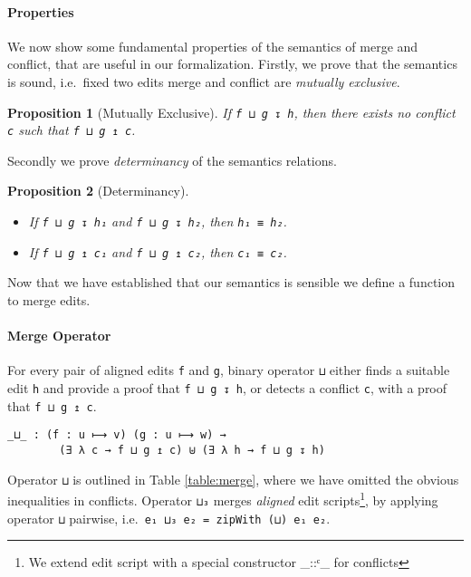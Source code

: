 \documentclass{sigplanconf}
\theoremstyle{plain}
\newtheorem{prop}{Proposition}
\begin{document}
\paragraph{Properties}
We now show some fundamental properties of the semantics of merge and
conflict, that are useful in our formalization.
Firstly, we prove that the semantics is sound, i.e.\ fixed two edits
merge and conflict are \emph{mutually exclusive}.
\begin{prop}[Mutually Exclusive]
  \label{prop:mutually-exclusive}
  If \texttt{f ⊔ g ↧ h}, then there exists no conflict \texttt{c} such
  that \texttt{f ⊔ g ↥ c}.
\end{prop}
Secondly we prove \emph{determinancy} of the semantics relations.
\begin{prop}[Determinancy]
\mbox{}
\label{prop:determinancy}
\begin{itemize}
\item If \texttt{f ⊔ g ↧ h₁} and \texttt{f ⊔ g ↧ h₂}, then \texttt{h₁
    ≡ h₂}.
%
\item  If \texttt{f ⊔ g ↥ c₁} and \texttt{f ⊔ g ↥ c₂}, then \texttt{c₁ ≡ c₂}.
\end{itemize}
\end{prop}
Now that we have established that our semantics is sensible we define
a function to merge edits.

\paragraph{Merge Operator}
For every pair of aligned edits \texttt{f} and \texttt{g}, binary
operator \texttt{⊔} either finds a suitable edit \texttt{h} and
provide a proof that \texttt{f ⊔ g ↧ h}, or detects a conflict
\texttt{c}, with a proof that \texttt{f ⊔ g ↥ c}.
        
\begin{verbatim}
_⊔_ : (f : u ⟼ v) (g : u ⟼ w) →
        (∃ λ c → f ⊔ g ↥ c) ⊎ (∃ λ h → f ⊔ g ↧ h)
\end{verbatim}
Operator \texttt{⊔} is outlined in Table \ref{table:merge}, where we
have omitted the obvious inequalities in conflicts.
%
Operator \texttt{⊔₃} merges \emph{aligned} edit scripts\footnote{We
  extend edit script with a special constructor \_::ᶜ\_ for
  conflicts}, by applying operator \texttt{⊔} pairwise, i.e.\
\texttt{e₁ ⊔₃ e₂ = zipWith (⊔) e₁ e₂}.
 
%
\end{document}
